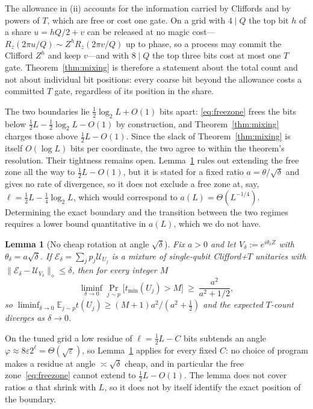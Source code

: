 \documentclass[aps,prx,twocolumn,superscriptaddress,nofootinbib,longbibliography]{revtex4-2}
\theoremstyle{plain}
\newtheorem{lemma}{Lemma}
\theoremstyle{definition}
\theoremstyle{remark}
\newcommand{\E}{\mathbb{E}}
\begin{document}
The allowance in (ii) accounts for the information carried by Cliffords and by powers of $T$, which are free or cost one gate. On a grid with $4\mid Q$ the top bit $h$ of a share $u=hQ/2+v$ can be released at no magic cost---$R_z(2\pi u/Q)\sim Z^hR_z(2\pi v/Q)$ up to phase, so a process may commit the Clifford $Z^h$ and keep $v$---and with $8\mid Q$ the top three bits cost at most one $T$ gate. Theorem~\ref{thm:mixing} is therefore a statement about the total count and not about individual bit positions: every coarse bit beyond the allowance costs a committed $T$ gate, regardless of its position in the share.

The two boundaries lie $\tfrac12\log_2L+O(1)$ bits apart: \eqref{eq:freezone} frees the bits below $\tfrac12L-\tfrac12\log_2L-O(1)$ by construction, and Theorem~\ref{thm:mixing} charges those above $\tfrac12L-O(1)$. Since the slack of Theorem~\ref{thm:mixing} is itself $O(\log L)$ bits per coordinate, the two agree to within the theorem's resolution. Their tightness remains open. Lemma~\ref{lem:nocheap} rules out extending the free zone all the way to $\tfrac12L-O(1)$, but it is stated for a fixed ratio $a=\theta/\sqrt\delta$ and gives no rate of divergence, so it does not exclude a free zone at, say, $\ell=\tfrac12L-\tfrac14\log_2L$, which would correspond to $a(L)=\Theta(L^{-1/4})$. Determining the exact boundary and the transition between the two regimes requires a lower bound quantitative in $a(L)$, which we do not have.

\begin{lemma}[No cheap rotation at angle $\sqrt\delta$]\label{lem:nocheap}
Fix $a>0$ and let $V_\delta:=e^{i\theta_\delta Z}$ with $\theta_\delta=a\sqrt\delta$. If $\mathcal E_\delta=\sum_jp_j\mathcal U_{U_j}$ is a mixture of single-qubit Clifford+$T$ unitaries with $\|\mathcal E_\delta-\mathcal U_{V_\delta}\|_\diamond\le\delta$, then for every integer $M$
\[
\liminf_{\delta\to0}\Pr_{j\sim p}\big[t_{\min}(U_j)>M\big]\ \ge\ \frac{a^2}{a^2+1/2},
\]
so $\liminf_{\delta\to0}\E_{j\sim p}t(U_j)\ge(M+1)a^2/(a^2+\tfrac12)$ and the expected $T$-count diverges as $\delta\to0$.
\end{lemma}
On the tuned grid a low residue of $\ell=\tfrac12L-C$ bits subtends an angle $\varphi\approx8\varepsilon2^\ell=\Theta(\sqrt\varepsilon)$, so Lemma~\ref{lem:nocheap} applies for every fixed $C$: no choice of program makes a residue at angle $\asymp\sqrt\delta$ cheap, and in particular the free zone~\eqref{eq:freezone} cannot extend to $\tfrac12L-O(1)$. The lemma does not cover ratios $a$ that shrink with $L$, so it does not by itself identify the exact position of the boundary.
\end{document}
